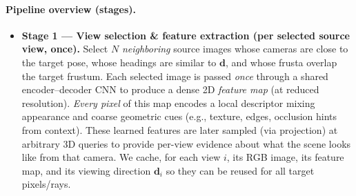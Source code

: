 \begin{enrichment}
\begin{enrichment}
     \paragraph{Pipeline overview (stages).}
     \begin{itemize}
         \item \textbf{Stage 1 — View selection \& feature extraction (per selected source view, once).}
         Select $N$ \emph{neighboring} source images whose cameras are close to the target pose, whose headings are similar to $\mathbf{d}$, and whose frusta overlap the target frustum. Each selected image is passed \emph{once} through a shared encoder--decoder CNN to produce a dense 2D \emph{feature map} (at reduced resolution). \emph{Every pixel} of this map encodes a local descriptor mixing appearance and coarse geometric cues (e.g., texture, edges, occlusion hints from context). These learned features are later sampled (via projection) at arbitrary 3D queries to provide per-view evidence about what the scene looks like from that camera. We cache, for each view $i$, its RGB image, its feature map, and its viewing direction $\mathbf{d}_i$ so they can be reused for all target pixels/rays.
         

\end{itemize}
\end{enrichment}
\end{enrichment}
